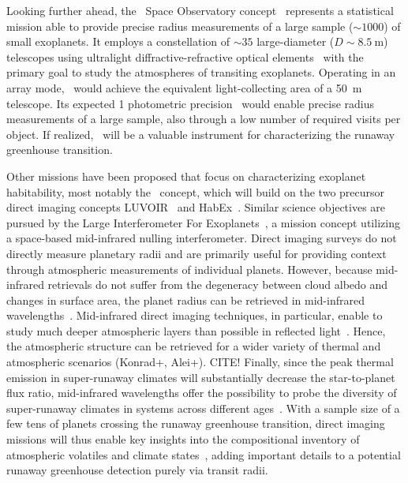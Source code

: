 \documentclass[twocolumn,twocolappendix]{aastex631}
\begin{document}
Looking further ahead, the \nautilus\ Space Observatory concept~\citep{Apai2019} represents a statistical mission able to provide precise radius measurements of a large sample ($\sim \num{1000}$) of small exoplanets.
It employs a constellation of $\sim \num{35}$ large-diameter ($D \sim \SI{8.5}{\meter}$) telescopes using ultralight diffractive-refractive optical elements~\citep{Milster2020} with the primary goal to study the atmospheres of transiting exoplanets.
Operating in an array mode, \nautilus\ would achieve the equivalent light-collecting area of a \SI{50}{\meter} telescope.
Its expected \SI{1}{\ppm} photometric precision~\citep{Apai2022} would enable precise radius measurements of a large sample, also through a low number of required visits per object.
If realized, \nautilus\ will be a valuable instrument for characterizing the runaway greenhouse transition.

Other missions have been proposed that focus on characterizing exoplanet habitability, most notably the \hwo\ concept, which will build on the two precursor direct imaging concepts LUVOIR~\citep{LUVOIR2019} and HabEx~\citep{Gaudi2020c}.
Similar science objectives are pursued by the Large Interferometer For Exoplanets~\citep[\life,][]{Quanz2021}, a mission concept utilizing a space-based mid-infrared nulling interferometer.
Direct imaging surveys do not directly measure planetary radii and are primarily useful for providing context through atmospheric measurements of individual planets.
However, because mid-infrared retrievals do not suffer from the degeneracy between cloud albedo and changes in surface area, the planet radius can be retrieved in mid-infrared wavelengths~\citep{2018ExA....46..543D,2021ExA...tmp..118Q}.
Mid-infrared direct imaging techniques, in particular, enable to study much deeper atmospheric layers than possible in reflected light~\citep{Wordsworth2022}.
Hence, the atmospheric structure can be retrieved for a wider variety of thermal and atmospheric scenarios (Konrad+, Alei+). CITE!
Finally, since the peak thermal emission in super-runaway climates will substantially decrease the star-to-planet flux ratio, mid-infrared wavelengths offer the possibility to probe the diversity of super-runaway climates in systems across different ages~\citep{2014ApJ...784...27L,2019A&A...621A.125B}.
With a sample size of a few tens of planets crossing the runaway greenhouse transition, direct imaging missions will thus enable key insights into the compositional inventory of atmospheric volatiles and climate states~\citep{2021exbi.book....5H,2022arXiv220505696C}, adding important details to a potential runaway greenhouse detection purely via transit radii.
\end{document}
